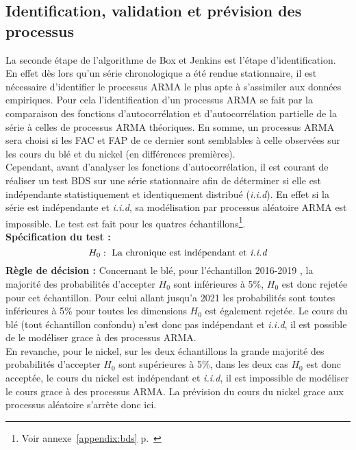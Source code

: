 \subsection{Identification, validation et prévision des processus}
La seconde étape de l'algorithme de Box et Jenkins est l'étape d'identification. En effet dès lors qu'un série chronologique a été rendue stationnaire, il est
nécessaire d'identifier le processus ARMA le plus apte à s'assimiler aux données empiriques. 
Pour cela l'identification d'un processus ARMA se fait par la comparaison des fonctions d'autocorrélation et d'autocorrélation partielle de la série à celles de processus 
ARMA théoriques. En somme, un processus ARMA sera choisi si les FAC et FAP de ce dernier sont semblables à celle observées sur les cours du blé et du nickel (en 
différences premières).\\[11pt]
Cependant, avant d'analyser les fonctions d'autocorrélation, il est courant de réaliser un test BDS sur une série stationnaire afin de déterminer si elle est 
indépendante statistiquement et identiquement distribué (\textit{i.i.d}). En effet si la série est indépendante et \textit{i.i.d}, sa modélisation par processus aléatoire 
ARMA est impossible. Le test est fait pour les quatres échantillons\footnote{Voir annexe~\ref{appendix:bds} p.~\pageref{appendix:bds}}.\\
\textbf{Spécification du test :} 
\begin{equation*}
    H_{0} : \text{ La chronique est indépendant et \textit{i.i.d}}
\end{equation*}
\textbf{Règle de décision :} Concernant le blé, pour l'échantillon 2016-2019 , la majorité des probabilités d'accepter $H_{0}$ sont inférieures à 5\%, $H_{0}$ est donc 
rejetée pour cet échantillon. Pour celui allant jusqu'a 2021 les probabilités sont toutes inférieures à 5\% pour toutes les dimensions $H_{0}$ est également rejetée.
Le cours du blé (tout échantillon confondu) n'est donc pas indépendant et \textit{i.i.d}, il est possible de le modéliser grace à des processus ARMA.\\[11pt]
En revanche, pour le nickel, sur les deux échantillons la grande majorité des probabilités d'accepter $H_{0}$ sont supérieures à 5\%, dans les deux cas $H_{0}$ est donc 
acceptée, le cours du nickel est indépendant et \textit{i.i.d}, il est impossible de modéliser le cours grace à des processus ARMA. La prévision du cours du nickel grace aux processus aléatoire s'arrête donc ici.

